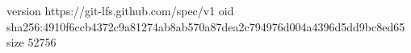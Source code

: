 version https://git-lfs.github.com/spec/v1
oid sha256:4910f6ccb4372c9a81274ab8ab570a87dea2c794976d004a4396d5dd9bc8ed65
size 52756
